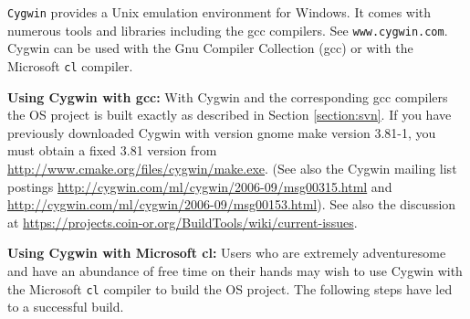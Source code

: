 \documentclass[11pt]{article}
\renewcommand{\_}{{\char"5F}}
\renewcommand{\{}{{\char"7B}}
\renewcommand{\}}{{\char"7D}}
\renewcommand{\^}{{\char"0D}}
\renewcommand{\'}{{\char"0D}}
\begin{document}
{\tt Cygwin} provides a Unix emulation environment for Windows. It comes with numerous tools and libraries including the gcc compilers. See {\tt www.cygwin.com}.   Cygwin can be used with the Gnu Compiler Collection (gcc) or with the Microsoft {\tt cl} compiler.


{\bf Using Cygwin with gcc:}  With Cygwin and the corresponding gcc compilers the OS project is  built exactly as described in Section \ref{section:svn}. If you have previously downloaded Cygwin with version gnome make version 3.81-1,  you must obtain a fixed 3.81 version from \url{http://www.cmake.org/files/cygwin/make.exe}. (See also  the Cygwin mailing list postings \url{http://cygwin.com/ml/cygwin/2006-09/msg00315.html} and \url{http://cygwin.com/ml/cygwin/2006-09/msg00153.html}).  See also the discussion at \url{https://projects.coin-or.org/BuildTools/wiki/current-issues}.


\vskip 8pt

{\bf Using Cygwin with Microsoft cl:}   Users who are extremely adventuresome and have an abundance  of free time on their hands may wish to use Cygwin with the Microsoft {\tt cl} compiler to build the OS project.   The following steps have led to a successful build.
\end{document}
